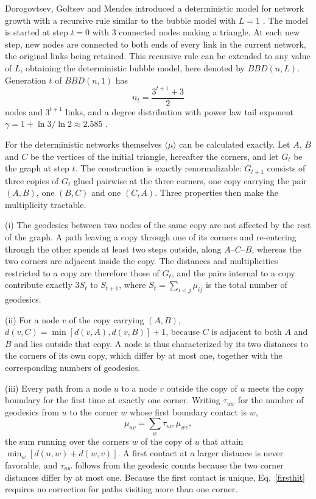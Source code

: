 \documentclass[reprint,aps,pre,amsmath,amssymb,superscriptaddress,showpacs]{revtex4-1}
\begin{document}
Dorogovtsev, Goltsev and Mendes introduced a deterministic model for network growth with a recursive rule similar to the bubble model with $L=1$ \cite{dorogovtsev2002fractal}. The model is started at step $t=0$ with 3 connected nodes making a triangle. At each new step, new nodes are connected to both ends of every link in the current network, the original links being retained. This recursive rule can be extended to any value of $L$, obtaining the deterministic bubble model, here denoted by $BBD(n, L)$. Generation $t$ of $BBD(n,1)$ has
%
\begin{equation}
n_t = \frac{3^{t+1}+3}{2}
\label{nBBD}
\end{equation}
%
nodes and $3^{t+1}$ links, and a degree distribution with power law tail exponent $\gamma = 1 + \ln 3/\ln 2 \approx 2.585$ \cite{dorogovtsev2002fractal}.

For the deterministic networks themselves $\langle\mu\rangle$ can be calculated exactly. Let $A$, $B$ and $C$ be the vertices of the initial triangle, hereafter the corners, and let $G_t$ be the graph at step $t$. The construction is exactly renormalizable: $G_{t+1}$ consists of three copies of $G_t$ glued pairwise at the three corners, one copy carrying the pair $(A,B)$, one $(B,C)$ and one $(C,A)$. Three properties then make the multiplicity tractable.

(i) The geodesics between two nodes of the same copy are not affected by the rest of the graph. A path leaving a copy through one of its corners and re-entering through the other spends at least two steps outside, along $A$--$C$--$B$, whereas the two corners are adjacent inside the copy. The distances and multiplicities restricted to a copy are therefore those of $G_t$, and the pairs internal to a copy contribute exactly $3S_t$ to $S_{t+1}$, where $S_t = \sum_{i<j}\mu_{ij}$ is the total number of geodesics.

(ii) For a node $v$ of the copy carrying $(A,B)$, $d(v,C) = \min[d(v,A), d(v,B)] + 1$, because $C$ is adjacent to both $A$ and $B$ and lies outside that copy. A node is thus characterized by its two distances to the corners of its own copy, which differ by at most one, together with the corresponding numbers of geodesics.

(iii) Every path from a node $u$ to a node $v$ outside the copy of $u$ meets the copy boundary for the first time at exactly one corner. Writing $\tau_{uw}$ for the number of geodesics from $u$ to the corner $w$ whose first boundary contact is $w$,
%
\begin{equation}
\mu_{uv} = \sum_{w} \tau_{uw}\,\mu_{wv},
\label{firsthit}
\end{equation}
%
the sum running over the corners $w$ of the copy of $u$ that attain $\min_w [d(u,w) + d(w,v)]$. A first contact at a larger distance is never favorable, and $\tau_{uw}$ follows from the geodesic counts because the two corner distances differ by at most one. Because the first contact is unique, Eq.~\eqref{firsthit} requires no correction for paths visiting more than one corner.
\end{document}

